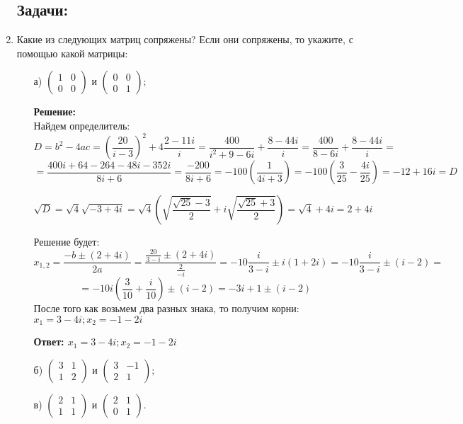 \documentclass[a4paper,12pt]{article}
\newcounter{z}
\begin{document}
\begin{enumerate}

\subsection*{Задачи:}




\item Какие из следующих матриц сопряжены? Если они сопряжены, то укажите, с помощью какой матрицы:
\begin{itemize}
\item[а)] $\begin{pmatrix}{1}&{0}\\{0}&{0}\end{pmatrix}$ и $\begin{pmatrix}{0}&{0}\\{0}&{1}\end{pmatrix};$

\textbf{Решение:}\\
Найдем определитель:
$$D=b^2-4ac =  (\frac{20}{i - 3})^2+4\frac{2 - 11i}i=\frac{400}{i^2+9-6i}+\frac{8-44i}{i}=\frac{400}{8-6i}+\frac{8-44i}{i}=$$ $$=\frac{400i+64-264-48i-352i}{8i+6}=\frac{-200}{8i+6}=-100 (\frac{1}{4i+3})=-100(\frac{3}{25}-\frac{4i}{25})=-12+16i=D$$

$$\sqrt{D}=\sqrt{4}\sqrt{-3+4i}=\sqrt{4}(\sqrt{\frac{\sqrt{25}-3}{2}}+i\sqrt{\frac{\sqrt{25}+3}{2}})=\sqrt{4}+4i=2+4i$$

Решение будет:
$$x_{1,2} = \frac{-b\pm (2+4i)}{2a}=\frac{\frac{20}{3-i}\pm (2+4i)}{\frac{2}{-i}}=-10\frac{i}{3-i}\pm i (1+2i)=-10\frac{i}{3-i}\pm(i-2) =$$
$$= -10i(\frac{3}{10}+\frac{i}{10})\pm(i-2)=-3i+1 \pm(i-2)$$
После того как возьмем два разных знака, то получим корни:
$x_1 = 3-4i; x_2=-1-2i$


\textbf{Ответ: $x_1 = 3-4i; x_2=-1-2i$}



\item[б)] $\begin{pmatrix}{3}&{1}\\{1}&{2}\end{pmatrix}$ и $\begin{pmatrix}{3}&{-1}\\{2}&{1}\end{pmatrix};$
\item[в)] $\begin{pmatrix}{2}&{1}\\{1}&{1}\end{pmatrix}$ и $\begin{pmatrix}{2}&{1}\\{0}&{1}\end{pmatrix}$.
\end{itemize}


\end{enumerate}
\end{document}
